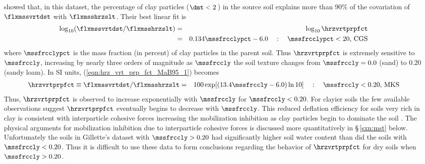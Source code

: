\documentclass[12pt,twoside]{book}
\begin{document}
\cite{MaB95} showed that, in this dataset, the percentage of clay
particles ($\dmt < 2$\,\um) in the source soil explains more than 90\%
of the covariation of $\flxmssvrtdst$ with $\flxmsshrzslt$. 
Their best linear fit is 
\begin{eqnarray}
\log_{10} ( \flxmssvrtdst / \flxmsshrzslt ) & = & \log_{10} \hrzvrtprpfct \nonumber \\
& = & 0.134 \mssfrcclypct - 6.0 \quad : \quad
\mbox{$\mssfrcclypct < 20$, CGS} 
\label{eqn:hrz_vrt_prp_fct_MaB95_1}
\end{eqnarray}
where $\mssfrcclypct$ is the mass fraction (in percent) of clay
particles in the parent soil.
Thus $\hrzvrtprpfct$ is extremely sensitive to $\mssfrccly$,
increasing by nearly three orders of magnitude as $\mssfrccly$
the soil texture changes from $\mssfrccly = 0.0$ (sand) to $0.20$
(sandy loam). 
In SI units, (\ref{eqn:hrz_vrt_prp_fct_MaB95_1}) becomes
\begin{eqnarray}
\hrzvrtprpfct \equiv \flxmssvrtdst / \flxmsshrzslt & = & 
100 \exp [ ( 13.4 \mssfrccly - 6.0 ) \ln 10 ] \quad : \quad 
\mbox{$\mssfrccly < 0.20$, MKS} 
\label{eqn:hrz_vrt_prp_fct_MaB95_2}
\end{eqnarray}
Thus, $\hrzvrtprpfct$ is observed to increase exponentially with
$\mssfrccly$ for $\mssfrccly < 0.20$. 
For clayier soils the few available observations suggest
$\hrzvrtprpfct$ eventually begins to decrease with $\mssfrccly$. 
This reduced deflation efficiency for soils very rich in clay is
consistent with interparticle cohesive forces increasing the
mobilization inhibition as clay particles begin to dominate the soil 
\cite[]{Gil79,Gil81,MaB95}.
The physical arguments for mobilization inhibition due to
interparticle cohesive forces is discussed more quantitatively in 
\S\,\ref{sxn:mst} below.
Unfortunately the soils in Gillette's dataset with 
$\mssfrccly > 0.20$ had significantly higher soil water content than
did the soils with $\mssfrccly < 0.20$.
Thus it is difficult to use these data to form conclusions regarding
the behavior of $\hrzvrtprpfct$ for dry soils when $\mssfrccly > 0.20$.
\end{document}
